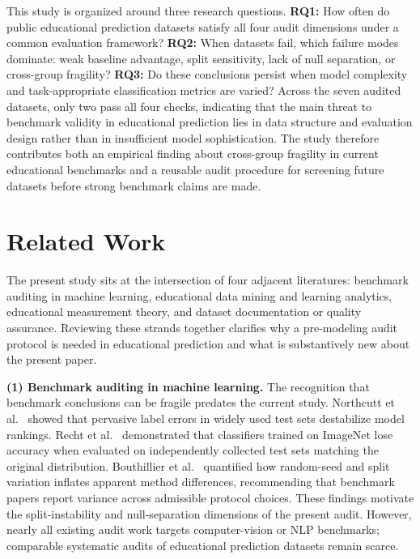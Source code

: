 \documentclass[10pt,letterpaper]{article}
\begin{document}
This study is organized around three research questions. \textbf{RQ1:} How often do public educational prediction datasets satisfy all four audit dimensions under a common evaluation framework? \textbf{RQ2:} When datasets fail, which failure modes dominate: weak baseline advantage, split sensitivity, lack of null separation, or cross-group fragility? \textbf{RQ3:} Do these conclusions persist when model complexity and task-appropriate classification metrics are varied? Across the seven audited datasets, only two pass all four checks, indicating that the main threat to benchmark validity in educational prediction lies in data structure and evaluation design rather than in insufficient model sophistication. The study therefore contributes both an empirical finding about cross-group fragility in current educational benchmarks and a reusable audit procedure for screening future datasets before strong benchmark claims are made.

\section{Related Work}

The present study sits at the intersection of four adjacent literatures: benchmark auditing in machine learning, educational data mining and learning analytics, educational measurement theory, and dataset documentation or quality assurance. Reviewing these strands together clarifies why a pre-modeling audit protocol is needed in educational prediction and what is substantively new about the present paper.

\textbf{(1) Benchmark auditing in machine learning.} The recognition that benchmark conclusions can be fragile predates the current study. Northcutt et al.~\citep{Northcutt2021} showed that pervasive label errors in widely used test sets destabilize model rankings. Recht et al.~\citep{Recht2019} demonstrated that classifiers trained on ImageNet lose accuracy when evaluated on independently collected test sets matching the original distribution. Bouthillier et al.~\citep{Bouthillier2021} quantified how random-seed and split variation inflates apparent method differences, recommending that benchmark papers report variance across admissible protocol choices. These findings motivate the split-instability and null-separation dimensions of the present audit. However, nearly all existing audit work targets computer-vision or NLP benchmarks; comparable systematic audits of educational prediction datasets remain scarce.
\end{document}
